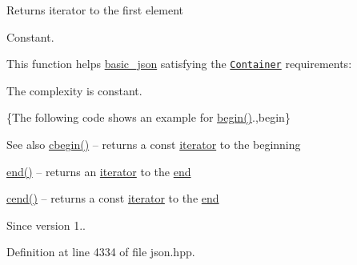  \begin{DoxyReturn}{Returns}
iterator to the first element
\end{DoxyReturn}
Constant.

This function helps {\ttfamily \hyperlink{classnlohmann_1_1basic__json}{basic\+\_\+json}} satisfying the \href{http://en.cppreference.com/w/cpp/concept/Container}{\tt Container} requirements\+:
\begin{DoxyItemize}
\item The complexity is constant.
\end{DoxyItemize}

\{The following code shows an example for {\ttfamily \hyperlink{classnlohmann_1_1basic__json_ad4e381c54039607be08d7af41a1f6ad1}{begin()}}.,begin\}

\begin{DoxySeeAlso}{See also}
\hyperlink{classnlohmann_1_1basic__json_aa7205e1926d3aea98adeced91b0ff5fb}{cbegin()} -- returns a const \hyperlink{classnlohmann_1_1basic__json_ae3c77a8f03096da2a32a3de0c317d445}{iterator} to the beginning 

\hyperlink{classnlohmann_1_1basic__json_a12ccf14d39ddae52f6c7e126105a230b}{end()} -- returns an \hyperlink{classnlohmann_1_1basic__json_ae3c77a8f03096da2a32a3de0c317d445}{iterator} to the \hyperlink{classnlohmann_1_1basic__json_a12ccf14d39ddae52f6c7e126105a230b}{end} 

\hyperlink{classnlohmann_1_1basic__json_a19dfb04c297ffb5f0ef84abfa4a5a087}{cend()} -- returns a const \hyperlink{classnlohmann_1_1basic__json_ae3c77a8f03096da2a32a3de0c317d445}{iterator} to the \hyperlink{classnlohmann_1_1basic__json_a12ccf14d39ddae52f6c7e126105a230b}{end}
\end{DoxySeeAlso}
\begin{DoxySince}{Since}
version 1.. 
\end{DoxySince}


Definition at line 4334 of file json.\+hpp.

\hypertarget{classnlohmann_1_1basic__json_a86a477c16dac3bdd4929fee2db394256}{}
